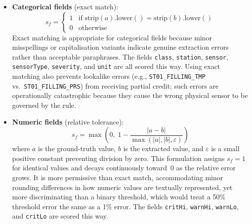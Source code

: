 ﻿\documentclass[11pt]{article}
\begin{document}
\begin{itemize}
\item \textbf{Categorical fields} (exact match):
      \[
        s_f =
        \begin{cases} 1 & \text{if } \mathrm{strip}(a).\mathrm{lower}() =
                          \mathrm{strip}(b).\mathrm{lower}() \\
                      0 & \text{otherwise}
        \end{cases}
      \]
      Exact matching is appropriate for categorical fields because minor
      misspellings or capitalisation variants indicate genuine extraction errors
      rather than acceptable paraphrases.
      The fields \texttt{class}, \texttt{station}, \texttt{sensor},
      \texttt{sensorType}, \texttt{severity}, and \texttt{unit} are all scored
      this way.
      Using exact matching also prevents lookalike errors
      (e.g., \texttt{ST01\_FILLING\_TMP} vs.\ \texttt{ST01\_FILLING\_PRS}) from
      receiving partial credit; such errors are operationally catastrophic because
      they cause the wrong physical sensor to be governed by the rule.

\item \textbf{Numeric fields} (relative tolerance):
      \[
        s_f = \max\!\left(0,\; 1 - \frac{|a - b|}{\max(|a|, |b|, \varepsilon)}\right)
      \]
      where $a$ is the ground-truth value, $b$ is the extracted value, and
      $\varepsilon$ is a small positive constant preventing division by zero.
      This formulation assigns $s_f = 1$ for identical values and decays
      continuously toward~0 as the relative error grows.
      It is more permissive than exact match, accommodating minor rounding
      differences in how numeric values are textually represented, yet more
      discriminating than a binary threshold, which would treat a 50\% threshold
      error the same as a 1\% error.
      The fields \texttt{critHi}, \texttt{warnHi}, \texttt{warnLo}, and
      \texttt{critLo} are scored this way.


\end{itemize}
\end{document}
